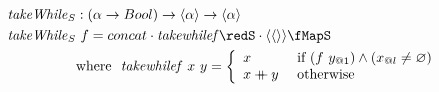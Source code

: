 \documentclass[preview]{standalone}
\begin{document}
\begin{align*}
  \mathit{takeWhile}_S &: (\alpha \rightarrow Bool) \rightarrow \vect{\alpha} \rightarrow \vect{\alpha} \\
  \mathit{takeWhile}_S &\ f = concat \cdot \mathit{takewhilef} \redS \cdot \vect{\vect{}} \fMapS\\
         & \text{where}\ \ \mathit{takewhilef}\ x\ y = 
           \left\{\begin{array}{ll}
                    x & \text{ if } (f\ y_{@1}) \wedge (x_{@l} \neq \varnothing)\\
                    x \fcat y & \text{ otherwise}
                  \end{array}
           \right.\\
\end{align*}
\end{document}
